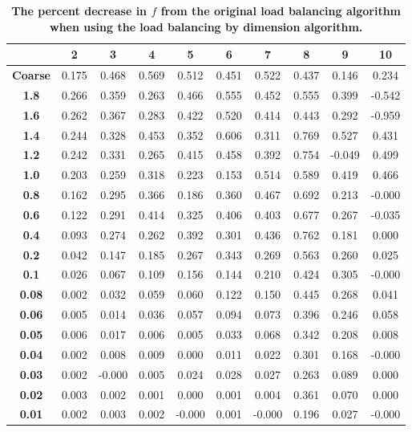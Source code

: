 \documentclass[letterpaper]{mandc2019}
\begin{document}
{\begin{table}[htb]
\begin{tabular}{c|c|c|c|c|c|c|c|c|c}
  \end{tabular}
\end{table}

\begin{table}[htb]
\centering
  \caption{\bf The percent decrease in $f$ from the original load balancing algorithm when using the load balancing by dimension algorithm.}
  \begin{tabular}{c|c|c|c|c|c|c|c|c|c} 
& \bf 2 &  \bf 3    & \bf  4   &  \bf  5   & \bf  6    &  \bf  7   &  \bf  8   &  \bf 9  &  \bf 10   \\ \hline \hline
\bf Coarse & 0.175 & 0.468 & 0.569 & 0.512 & 0.451 & 0.522 & 0.437 & 0.146 & 0.234 \\  \hline 
\bf   1.8& 0.266 & 0.359 & 0.263 & 0.466 & 0.555 & 0.452 & 0.555 & 0.399 & -0.542 \\ \hline 
\bf   1.6& 0.262 & 0.367 & 0.283 & 0.422 & 0.520 & 0.414 & 0.443 & 0.292 & -0.959 \\ \hline 
\bf   1.4& 0.244 & 0.328 & 0.453 & 0.352 & 0.606 & 0.311 & 0.769 & 0.527 & 0.431 \\  \hline
\bf   1.2& 0.242 & 0.331 & 0.265 & 0.415 & 0.458 & 0.392 & 0.754 & -0.049 & 0.499 \\ \hline 
\bf   1.0& 0.203 & 0.259 & 0.318 & 0.223 & 0.153 & 0.514 & 0.589 & 0.419 & 0.466 \\  \hline
\bf   0.8& 0.162 & 0.295 & 0.366 & 0.186 & 0.360 & 0.467 & 0.692 & 0.213 & -0.000 \\ \hline 
\bf   0.6& 0.122 & 0.291 & 0.414 & 0.325 & 0.406 & 0.403 & 0.677 & 0.267 & -0.035 \\ \hline 
\bf   0.4& 0.093 & 0.274 & 0.262 & 0.392 & 0.301 & 0.436 & 0.762 & 0.181 & 0.000 \\  \hline
\bf   0.2& 0.042 & 0.147 & 0.185 & 0.267 & 0.343 & 0.269 & 0.563 & 0.260 & 0.025 \\  \hline
\bf   0.1& 0.026 & 0.067 & 0.109 & 0.156 & 0.144 & 0.210 & 0.424 & 0.305 & -0.000 \\ \hline 
\bf   0.08&0.002 & 0.032 & 0.059 & 0.060 & 0.122 & 0.150 & 0.445 & 0.268 & 0.041 \\  \hline
\bf   0.06&0.005 & 0.014 & 0.036 & 0.057 & 0.094 & 0.073 & 0.396 & 0.246 & 0.058 \\  \hline
\bf   0.05&0.006 & 0.017 & 0.006 & 0.005 & 0.033 & 0.068 & 0.342 & 0.208 & 0.008 \\  \hline
\bf   0.04&0.002 & 0.008 & 0.009 & 0.000 & 0.011 & 0.022 & 0.301 & 0.168 & -0.000 \\ \hline 
\bf   0.03&0.002 & -0.000 & 0.005 & 0.024 & 0.028 & 0.027 & 0.263 & 0.089 & 0.000 \\ \hline 
\bf   0.02&0.003 & 0.002 & 0.001 & 0.000 & 0.001 & 0.004 & 0.361 & 0.070 & 0.000 \\  \hline
\bf   0.01&0.002 & 0.003 & 0.002 & -0.000 & 0.001 & -0.000 & 0.196 & 0.027 & -0.000 \\ \hline 


\end{tabular}
\end{table}}
\end{document}
